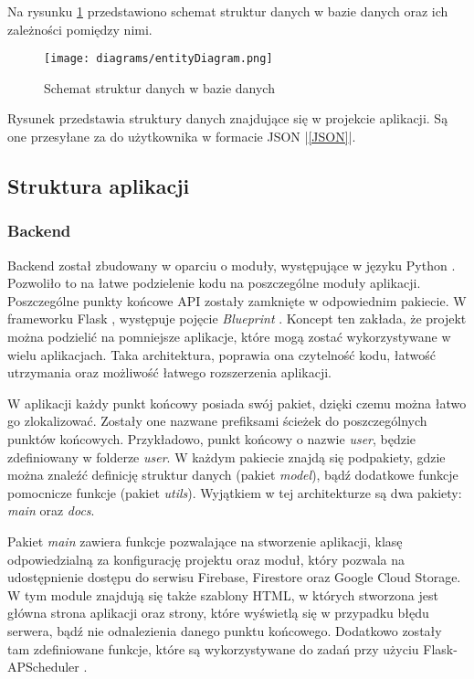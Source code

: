 Na rysunku \ref{database} przedstawiono schemat struktur danych w bazie danych oraz ich zależności pomiędzy nimi.

\begin{figure}[H]
    \centering
    \texttt{[image: diagrams/entityDiagram.png]}
    \caption{Schemat struktur danych w bazie danych}
    \label{database}
\end{figure}
Rysunek przedstawia struktury danych znajdujące się w projekcie aplikacji. Są one przesyłane za do użytkownika w formacie JSON |\ref{JSON}|.


\subsection{Struktura aplikacji}
\subsubsection{Backend}
Backend został zbudowany w oparciu o moduły, występujące w języku Python \cite{python}. Pozwoliło to na łatwe podzielenie kodu na poszczególne moduły aplikacji. Poszczególne punkty końcowe API zostały zamknięte w odpowiednim pakiecie. W frameworku Flask \cite{flask}, występuje pojęcie \textit{Blueprint} \cite{flask_blueprint}. Koncept ten zakłada, że projekt można podzielić na pomniejsze aplikacje, które mogą zostać wykorzystywane w wielu aplikacjach. Taka architektura, poprawia ona czytelność kodu, łatwość utrzymania oraz możliwość łatwego rozszerzenia aplikacji.

W aplikacji każdy punkt końcowy posiada swój pakiet, dzięki czemu można łatwo go zlokalizować. Zostały one nazwane prefiksami ścieżek do poszczególnych punktów końcowych. Przykładowo, punkt końcowy o nazwie \textit{user}, będzie zdefiniowany w folderze \textit{user}. W każdym pakiecie znajdą się podpakiety, gdzie można znaleźć definicję struktur danych (pakiet \textit{model}), bądź dodatkowe funkcje pomocnicze funkcje (pakiet \textit{utils}). Wyjątkiem w tej architekturze są dwa pakiety: \textit{main} oraz \textit{docs}.

Pakiet \textit{main} zawiera funkcje pozwalające na stworzenie aplikacji, klasę odpowiedzialną za konfigurację projektu oraz moduł, który pozwala na udostępnienie dostępu do serwisu Firebase, Firestore oraz Google Cloud Storage. W tym module znajdują się także szablony HTML, w których stworzona jest główna strona aplikacji oraz strony, które wyświetlą się w przypadku błędu serwera, bądź nie odnalezienia danego punktu końcowego. Dodatkowo zostały tam zdefiniowane funkcje, które są wykorzystywane do zadań przy użyciu Flask-APScheduler \cite{flask_apscheduler}.

